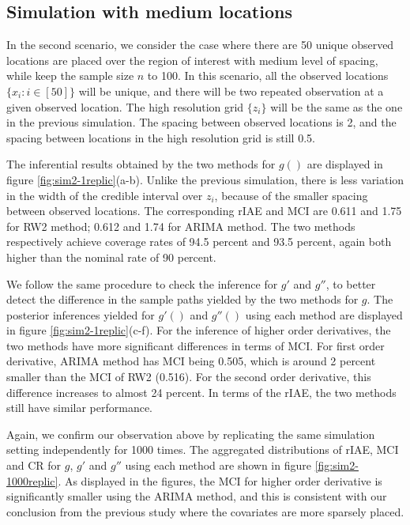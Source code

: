 \documentclass{article}
\begin{document}
\subsection{Simulation with medium locations}

In the second scenario, we consider the case where there are 50 unique observed locations are placed over the region of interest with medium level of spacing, while keep the sample size $n$ to 100. In this scenario, all the observed locations $\{x_i: i\in [50]\}$ will be unique, and there will be two repeated observation at a given observed location. The high resolution grid $\{z_i\}$ will be the same as the one in the previous simulation. The spacing between observed locations is 2, and the spacing between locations in the high resolution grid is still 0.5. 

The inferential results obtained by the two methods for $g()$ are displayed in figure \ref{fig:sim2-1replic}(a-b). Unlike the previous simulation, there is less variation in the width of the credible interval over $z_i$, because of the smaller spacing between observed locations. The corresponding rIAE and MCI are 0.611 and 1.75 for RW2 method; 0.612 and 1.74 for ARIMA method. The two methods respectively achieve coverage rates of 94.5 percent and 93.5 percent, again both higher than the nominal rate of 90 percent. 

We follow the same procedure to check the inference for $g'$ and $g''$, to better detect the difference in the sample paths yielded by the two methods for $g$. The posterior inferences yielded for $g'()$ and $g''()$ using each method are displayed in figure \ref{fig:sim2-1replic}(c-f).
For the inference of higher order derivatives, the two methods have more significant differences in terms of MCI. For first order derivative, ARIMA method has MCI being 0.505, which is around 2 percent smaller than the MCI of RW2 (0.516). For the second order derivative, this difference increases to almost 24 percent. In terms of the rIAE, the two methods still have similar performance.

Again, we confirm our observation above by replicating the same simulation setting independently for 1000 times. The aggregated distributions of rIAE, MCI and CR for $g$, $g'$ and $g''$ using each method are shown in figure \ref{fig:sim2-1000replic}. As displayed in the figures, the MCI for higher order derivative is significantly smaller using the ARIMA method, and this is consistent with our conclusion from the previous study where the covariates are more sparsely placed.
\end{document}
